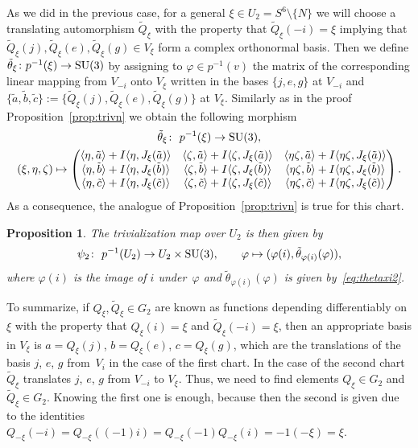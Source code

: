 \documentclass[10pt,a4paper]{amsart}
\numberwithin{equation}{section}
\newtheorem{Proposition}[Theorem]{Proposition}
 { \theoremstyle{definition}
\newtheorem{Definition}[Theorem]{Definition}
\newtheorem{Remark}[Theorem]{Remark} }
\begin{document}
As we did in the previous case, for a general $\xi \in U_2=S^6{\setminus}\{ N \}$ we will choose a translating auto\-morphism $\tilde{Q}_\xi$ with the property that $\tilde{Q}_\xi(-i)=\xi$ implying that $\tilde{Q}_\xi (j),\tilde{Q}_\xi (e),\tilde{Q}_\xi (g) \in V_\xi$ form a complex orthonormal basis. Then we define $\tilde{\theta}_\xi \colon p^{-1}(\xi) \rightarrow {\rm SU}(3)$ by assigning to $\varphi \in p^{-1}(v)$ the matrix of the corresponding linear mapping from $V_{-i}$ onto $V_{\xi}$ written in the bases $\{j,e,g\}$ at $V_{-i}$ and $\big\{\tilde{a},\tilde{b},\tilde{c} \big\} := \big\{\tilde{Q}_\xi (j),\tilde{Q}_\xi (e),\tilde{Q}_\xi (g)\big\}$ at $V_\xi$. Similarly as in the proof Proposition~\ref{prop:trivn} we obtain the following morphism
\begin{gather}
\tilde{\theta}_\xi \colon \ p^{-1}(\xi) \rightarrow {\rm SU}(3), \nonumber\\
(\xi,\eta,\zeta) \mapsto
\begin{pmatrix}
\langle \eta,\tilde{a} \rangle + I\langle \eta,J_\xi(\tilde{a}) \rangle & \langle \zeta,\tilde{a} \rangle + I\langle \zeta,J_\xi(\tilde{a}) \rangle & \langle \eta \zeta,\tilde{a} \rangle + I\langle \eta \zeta,J_\xi(\tilde{a}) \rangle\\
\langle \eta,\tilde{b} \rangle +I\langle \eta,J_\xi(\tilde{b}) \rangle & \langle \zeta,\tilde{b} \rangle +I\langle \zeta,J_\xi(\tilde{b}) \rangle & \langle \eta \zeta,\tilde{b} \rangle +I\langle \eta \zeta,J_\xi(\tilde{b}) \rangle\\
\langle \eta,\tilde{c} \rangle +I\langle \eta,J_\xi(\tilde{c}) \rangle & \langle \zeta,\tilde{c} \rangle +I\langle \zeta,J_\xi(\tilde{c}) \rangle & \langle \eta \zeta,\tilde{c} \rangle +I\langle \eta \zeta,J_\xi(\tilde{c}) \rangle
\end{pmatrix}.\label{eq:thetaxi2}
\end{gather}
As a consequence, the analogue of Proposition~\ref{prop:trivn} is true for this chart.
\begin{Proposition} \label{prop:trivs} The trivialization map over $U_2$ is then given by
 \[\psi_2\colon \ p^{-1}(U_2) \rightarrow U_2 \times {\rm SU}(3), \qquad \varphi \mapsto (\varphi(i),\tilde{\theta}_{\varphi(i)}(\varphi) ),\]
 where $\varphi(i)$ is the image of $i$ under~$\varphi$ and $\tilde{\theta}_{\varphi(i)}(\varphi)$ is given by~\eqref{eq:thetaxi2}.
\end{Proposition}

To summarize, if $Q_\xi ,\tilde{Q}_\xi \in G_2$ are known as functions depending differentiably on $\xi$ with the property that $Q_\xi(i)=\xi$ and $\tilde{Q}_\xi(-i)=\xi$, then an appropriate basis in $V_\xi$ is $a=Q_\xi(j)$, $b=Q_\xi(e)$, $c=Q_\xi(g)$, which are the translations of the basis $j$, $e$, $g$ from~$V_i$ in the case of the first chart. In the case of the second chart~$\tilde{Q}_\xi$ translates $j$, $e$, $g$ from $V_{-i}$ to $V_\xi$. Thus, we need to find elements $Q_\xi \in G_2$ and $\tilde{Q}_\xi \in G_2$. Knowing the first one is enough, because then the second is given due to the identities $Q_{-\xi}(-i)=Q_{-\xi}((-1)i)=Q_{-\xi}(-1)Q_{-\xi}(i)=-1(-\xi)=\xi$.
\end{document}
